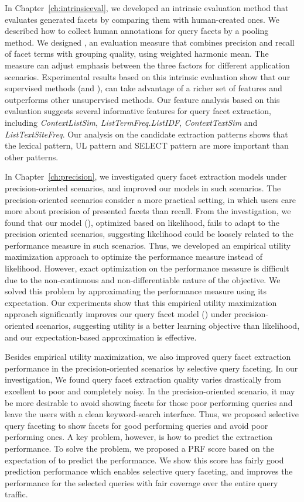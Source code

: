 In Chapter~\ref{ch:intrinsiceval}, we developed an intrinsic evaluation method that evaluates generated facets by comparing them with human-created ones. We described how to collect human annotations for query facets by a pooling method. We designed \PRF, an evaluation measure that combines precision and recall of facet terms with grouping quality, using weighted harmonic mean. The measure can adjust emphasis between the three factors for different application scenarios. Experimental results based on this intrinsic evaluation show that our supervised methods (\QFI and \QFJ), can take advantage of a richer set of features and outperforms other unsupervised methods. Our feature analysis based on this evaluation suggests several informative features for query facet extraction, including \textit{ContextListSim}, \textit{ListTermFreq.ListIDF}, \textit{ContextTextSim} and \textit{ListTextSiteFreq}. Our analysis on the candidate extraction patterns shows that the lexical pattern, UL pattern and SELECT pattern are more important than other patterns.

In Chapter~\ref{ch:precision}, we investigated query facet extraction models under precision-oriented scenarios, and improved our models in such scenarios. The precision-oriented scenarios consider a more practical setting, in which users care more about precision of presented facets than recall. From the investigation, we found that our model (\QFJ), optimized based on likelihood, fails to adapt to the precision oriented scenarios, suggesting likelihood could be loosely related to the performance measure in such scenarios. Thus, we developed an empirical utility maximization approach to optimize the performance measure instead of likelihood. However, exact optimization on the performance measure is difficult due to the non-continuous and non-differentiable nature of the objective. We solved this problem by approximating the performance measure using its expectation. Our experiments show that this empirical utility maximization approach significantly improves our query facet model (\QFJ) under precision-
oriented scenarios, suggesting utility is a better learning objective than likelihood, and our expectation-based approximation is effective. 
 
Besides empirical utility maximization, we also improved query facet extraction performance in the precision-oriented scenarios by selective query faceting. In our investigation, We found query facet extraction quality varies drastically from excellent to poor and completely noisy. In the precision-oriented scenario, it may be more desirable to avoid showing facets for those poor performing queries and leave the users with a clean keyword-search interface. Thus, we proposed selective query faceting to show facets for good performing queries and avoid poor performing ones. A key problem, however, is how to predict the extraction performance. To solve the problem, we proposed a PRF score based on the expectation of \PRF to predict the performance. We show this score has fairly good prediction performance which enables selective query faceting, and improves the performance for the selected queries with fair coverage over the entire query traffic.


